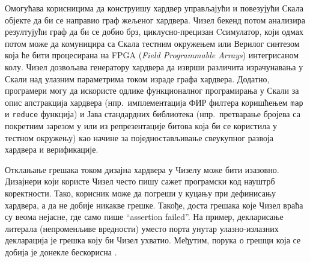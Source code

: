 \documentclass[12pt, a4paper]{article}
\def\CC{{C\nolinebreak[4]\hspace{-.05em}\raisebox{.4ex}{\tiny\bf ++}}}
\theoremstyle{definition}
\begin{document}
Омогућава корисницима да конструишу хардвер управљајући и повезујући Скала објекте да би се направио граф жељеног хардвера. Чизел бекенд потом анализира резултујући граф да би се добио брз,
циклусно-прецизан \CC\phantom{a}симулатор, који одмах потом може да комуницира са Скала тестним окружењем или Верилог синтезом која ће бити процесирана на FPGA (\textit{Field Programmable Arrays}) интегрисаном колу. Чизел дозвољава генератору хардвера да изврши различита израчунавања у Скали над улазним параметрима током израде графа хардвера. Додатно, програмери могу да искористе одлике функционалног програмирања у Скали за опис апстракција хардвера (нпр.\ имплементација ФИР филтера коришћењем \verb+map+ и \verb+reduce+ функција) и Јава стандардних библиотека (нпр.\ претварање бројева са покретним зарезом у или из репрезентације битова која би се користила у тестном окружењу) као начине за поједностављивање свеукупног развоја хардвера и верификације.
%

Отклањање грешака током дизајна хардвера у Чизелу може бити изазовно. Дизајнери који користе Чизел често пишу сажет програмски код науштрб коректности. Тако, корисник може да погреши у куцању при дефинисању хардвера, а да не добије никакве грешке. Такође, доста грешака које Чизел враћа су веома нејасне, где само пише ``assertion failed''. На пример, декларисање литерала (непроменљиве вредности) уместо порта унутар улазно-излазних декларација је грешка коју би Чизел ухватио. Међутим, порука о грешци која се добија је донекле бескорисна \cite{berkeley_twigg}.
\end{document}
